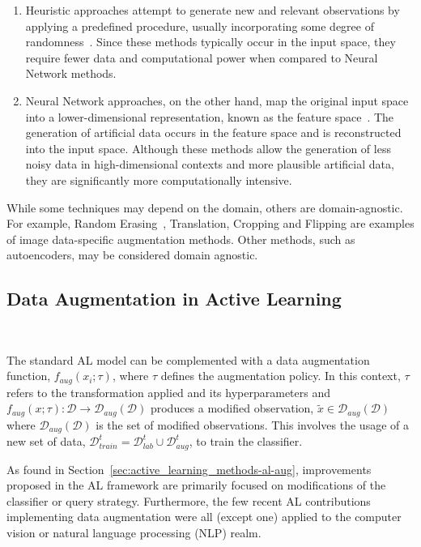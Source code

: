 \begin{enumerate}
    \item Heuristic approaches attempt to generate new and relevant
        observations by applying a predefined procedure,
        usually incorporating some degree of randomness~\cite{Kashefi2020}.
        Since these methods typically occur in the input space, they require
        fewer data and computational power when compared to Neural Network
        methods. 
    \item Neural Network approaches, on the other hand, map the original input
        space into a lower-dimensional representation, known as the feature
        space~\cite{DeVries2017}. The generation of artificial data occurs in
        the feature space and is reconstructed into the input space. Although
        these methods allow the generation of less noisy data in
        high-dimensional contexts and more plausible artificial data, they are
        significantly more computationally intensive. 
\end{enumerate}

While some techniques may depend on the domain, others are domain-agnostic.
For example, Random Erasing~\cite{Zhong2020}, Translation, Cropping and
Flipping are examples of image data-specific augmentation methods. Other
methods, such as autoencoders, may be considered domain agnostic.

\subsection{Data Augmentation in Active Learning
}~\label{sec:data_augmentation_in_al-al-aug}

The standard AL model can be complemented with a data augmentation
function, $f_{aug}(x_i;\tau)$, where $\tau$ defines the augmentation policy.
In this context, $\tau$ refers to the transformation applied and its
hyperparameters and $f_{aug}(x;\tau): \mathcal{D} \rightarrow
\mathcal{D}_{aug}(\mathcal{D})$ produces a modified observation,
$\tilde{x} \in \mathcal{D}_{aug}(\mathcal{D})$ where
$\mathcal{D}_{aug}(\mathcal{D})$ is the set of modified observations. This
involves the usage of a new set of data, $\mathcal{D}_{train}^t =
\mathcal{D}_{lab}^t \cup \mathcal{D}_{aug}^t$, to train the classifier.


As found in Section~\ref{sec:active_learning_methods-al-aug}, improvements proposed
in the AL framework are primarily focused on modifications of the
classifier or query strategy. Furthermore, the few recent AL contributions
implementing data augmentation were all (except one) applied to the
computer vision or natural language processing (NLP) realm. 

